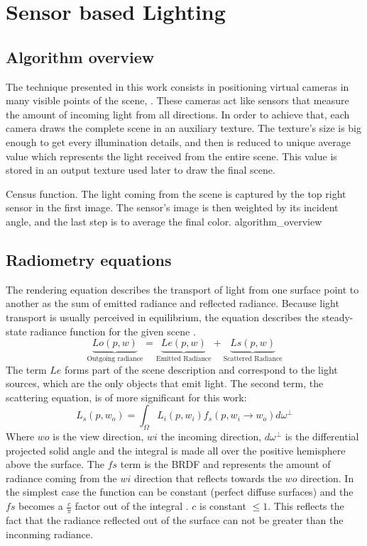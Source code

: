 \documentclass[10pt, conference]{IEEEtran}
\begin{document}
\section{Sensor based Lighting}
%

\subsection{Algorithm overview}
%
The technique presented in this work consists in positioning virtual cameras in many visible points of the scene, .
These cameras act like sensors that measure the amount of incoming light from all directions. 
In order to achieve that, each camera draws the complete scene in an auxiliary texture. 
The texture's size is big enough to get every illumination details, and then is reduced to unique average value which represents the light received from the entire scene. 
This value is stored in an output texture used later to draw the final scene. 

\subimages
	{Census function. The light coming from the scene is captured by the top right sensor in the first image. 
	The sensor's image is then weighted by its incident angle, and the last step is to average the final color.}
	{algorithm_overview}{
}

\subsection{Radiometry equations}
%
The rendering equation \cite{The_rendering_equation} describes the transport of light from one surface point to another as the sum of emitted radiance and reflected radiance. Because light transport is usually perceived in equilibrium, the equation describes the steady-state radiance function for the given scene \cite{The_rendering_equation}.
\[
	\underbrace{Lo(p,w)}_\text{Outgoing radiance} = \underbrace{Le(p,w)}_\text{Emitted Radiance} + \underbrace{Ls(p,w)}_\text{Scattered Radiance}
\]
The term $Le$ forms part of the scene description and correspond to the light sources, which are the only objects that emit light. The second term, the scattering equation, is of more significant for this work: 
\[
	L_s(p,w_o) = \int_ \Omega L_i(p,w_i)f_s(p,w_i\rightarrow w_o)d\omega^\perp
\]
Where $wo$ is the view direction, $wi$ the incoming direction, $d\omega^\perp$ is the differential projected solid angle and the integral is made all over the positive hemisphere above the surface.  The $fs$ term is the BRDF \cite{brdf} and represents the amount of radiance coming from the $wi$ direction that reflects towards the $wo$ direction. 
In the simplest case the function can be constant (perfect diffuse surfaces) and the $fs$ becomes a $\frac{c}{\pi}$ factor out of the integral \cite{perfect_diffuse_surfaces}.
$c$ is constant $\leq 1$. This reflects the fact that the radiance reflected out of the surface can not be greater than the inconming radiance.\\
\end{document}
